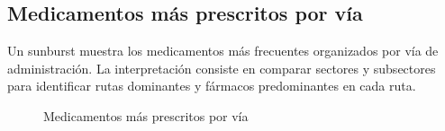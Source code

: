 \subsection{Medicamentos más prescritos por vía}
Un sunburst \cite{sunburst} muestra los medicamentos más frecuentes organizados por vía de administración. La interpretación consiste en comparar sectores y subsectores para identificar rutas dominantes y fármacos predominantes en cada ruta.
\begin{figure}[H]
  \centering
  \caption{Medicamentos más prescritos por vía}
  \label{fig:chart-sunburst}
\end{figure}

